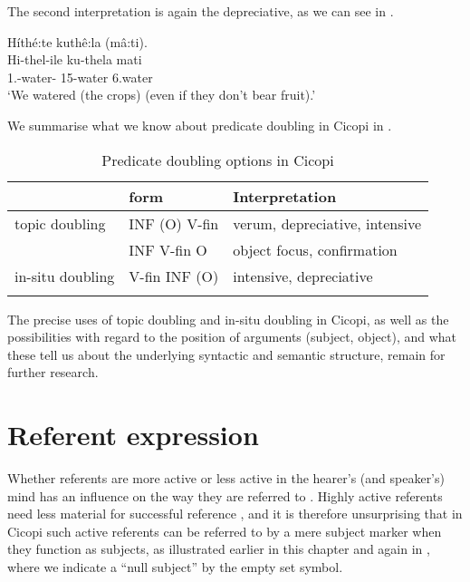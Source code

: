 \documentclass[output=paper]{langscibook}
\begin{document}
\z

The second interpretation is again the depreciative, as we can see in .

\ea
\label{bkm:Ref121149946}
Híthé:te kuthê:la (mâ:ti).\\
\gll
Hi-thel-ile    ku-thela  mati\\
1\PL.\SM{}-water-\PFV{}  15-water  6.water\\
\glt
‘We watered (the crops) (even if they don’t bear fruit).’\\

\z

We summarise what we know about predicate doubling in Cicopi in .

\begin{table}
\begin{tabularx}{\textwidth}{XXl}
\lsptoprule
 & form & Interpretation\\
\midrule
topic doubling & INF (O) V-fin & verum, depreciative, intensive\\
& INF V-fin O & object focus, confirmation\\
\addlinespace
in-situ doubling & V-fin INF (O) & intensive, depreciative\\
\lspbottomrule
\end{tabularx}
\caption{Predicate doubling options in Cicopi}
\label{tab:cicopi-preddoub}
\end{table}

The precise uses of topic doubling and in-situ doubling in Cicopi, as well as the possibilities with regard to the position of arguments (subject, object), and what these tell us about the underlying syntactic and semantic structure, remain for further research.

\section{Referent expression}
\label{bkm:Ref127267714}
Whether referents are more active or less active in the hearer’s (and speaker’s) mind has an influence on the way they are referred to \citep{Chafe1987}. Highly active referents need less material for successful reference \citep{Ariel1990,GundelEtAl1993}, and it is therefore unsurprising that in Cicopi such active referents can be referred to by a mere subject marker when they function as subjects, as illustrated earlier in this chapter and again in , where we indicate a “null subject” by the empty set symbol.
\end{document}
